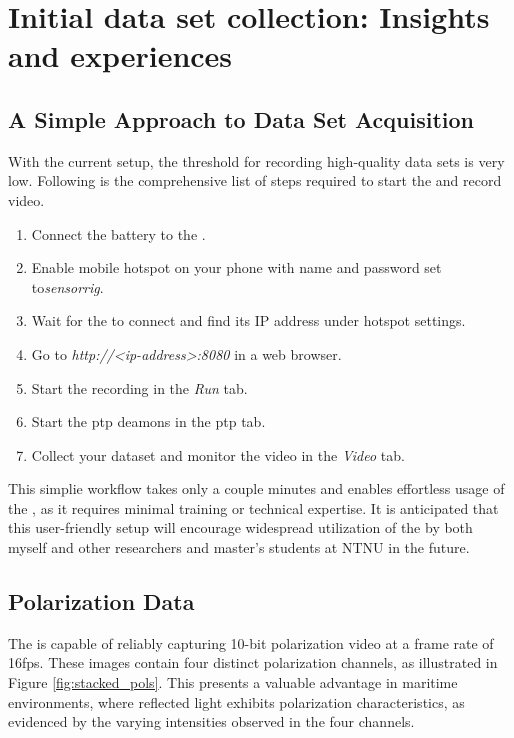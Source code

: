 \chapter{Initial data set collection: Insights and experiences}
\label{chap:results}

\section{A Simple Approach to Data Set Acquisition}
With the current setup, the threshold for recording high-quality data sets is very low.
Following is the comprehensive list of steps required to start the \sr and record video.
\begin{enumerate}
    \item Connect the battery to the \jx.
    \item Enable mobile hotspot on your phone with name and password set to\textit{sensorrig}.
    \item Wait for the \sr to connect and find its IP address under hotspot settings.
    \item Go to \textit{http://<ip-address>:8080} in a web browser.
    \item Start the recording in the \textit{Run} tab.
    \item Start the \gls{ptp} deamons in the \gls{ptp} tab.
    \item Collect your dataset and monitor the video in the \textit{Video} tab.
\end{enumerate}
This simplie workflow takes only a couple minutes and enables effortless usage of the \sr, as it requires minimal training or technical expertise.
It is anticipated that this user-friendly setup will encourage widespread utilization of the \sr by both myself and other researchers and master's students at NTNU in the future.


\section{Polarization Data}
\label{sec:pol_benefits}
The \sr is capable of reliably capturing 10-bit polarization video at a frame rate of 16fps.
These images contain four distinct polarization channels, as illustrated in Figure \ref{fig:stacked_pols}.
This presents a valuable advantage in maritime environments, where reflected light exhibits polarization characteristics, as evidenced by the varying intensities observed in the four channels.

